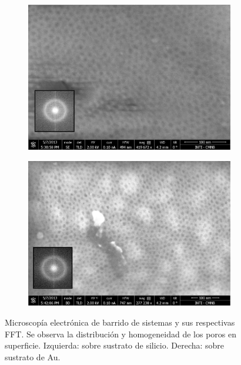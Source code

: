 			\begin{figure}[th]
		 	   	    \begin{subfigure}[t]{0.49\textwidth}
			        	\includegraphics[width=\textwidth]{Imagenes/F127_Si_sup.jpg}
			       		\end{subfigure}
					\begin{subfigure}[t]{0.49\textwidth}
			 	   	    \includegraphics[width=\textwidth]{Imagenes/F127_Au_sup.jpg}
			       		\end{subfigure}
					\caption[MEB arreglo poroso para \pdmF\space sobre Si y Au.]{Microscopía electrónica de barrido de sistemas \pdmF\space y sus respectivas FFT. Se observa la distribución y homogeneidad de los poros en superficie. Izquierda: sobre sustrato de silicio. Derecha: sobre sustrato de Au.}	 
					 \label{fig:F127_Si_Au}
					 \end{figure}

